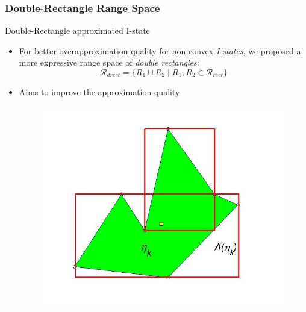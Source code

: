 \subsubsection[Double-Rectangle Range Space]{Double-Rectangle Range Space}
\begin{frame}{Double-Rectangle approximated I-state}
  \begin{itemize}
  \item For better overapproximation quality for non-convex \emph{I-states},
    we proposed a more expressive range space of \emph{double rectangles}: \\
    \begin{equation}
      \mathcal{R}_{drect} = \{ R_1 \cup R_2 \mid R_1, R_2 \in \mathcal{R}_{rect} \}
    \end{equation}
  \item Aims to improve the approximation quality
    \begin{figure}
      \includegraphics[scale=0.2]{figs/poly.jpg}
    \end{figure}
  \end{itemize}
\end{frame}

